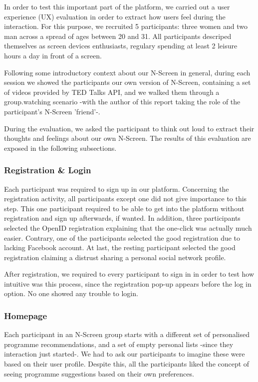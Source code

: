 \documentclass{acm_proc_article-sp}
\begin{document}
In order to test this important part of the platform, we carried out a user experience (UX) evaluation in order to extract how users feel during the interaction. For this purpose, we recruited 5 participants: three women and two man across a spread of ages between 20 and 31. All participants descriped themselves as screen devices enthusiasts, regulary spending at least 2 leisure hours a day in front of a screen. 

Following some introductory context about our N-Screen in general, during each session we showed the participants our own version of N-Screen, containing a set of videos provided by TED Talks API, and we walked them through a group.watching scenario -with the author of this report taking the role of the participant's N-Screen 'friend'-. 

During the evaluation, we asked the participant to think out loud to extract their thoughts and feelings about our own N-Screen. The results of this evaluation are exposed in the following subsections. 

\subsubsection{Registration \& Login}

Each participant was required to sign up in our platform. Concerning the registration activity, all participants except one did not give importance to this step. This one participant required to be able to get into the platform without registration and sign up afterwards, if wanted. In addition, three participants selected the OpenID registration explaining that the one-click was actually much easier. Contrary, one of the participants selected the good registration due to lacking Facebook account. At last, the resting participant selected the good registration claiming a distrust sharing a personal social network profile.  

After registration, we required to every participant to sign in in order to test how intuitive was this process, since the registration pop-up appears before the log in option. No one showed any trouble to login.

\subsubsection{Homepage}

Each participant in an N-Screen group starts with a different set of personalised programme recommendations, and a set of empty personal lists -since they interaction just started-. We had to ask our participants to imagine these were based on their user profile. Despite this, all the participants liked the concept of seeing programme suggestions based on their own preferences.
\end{document}
